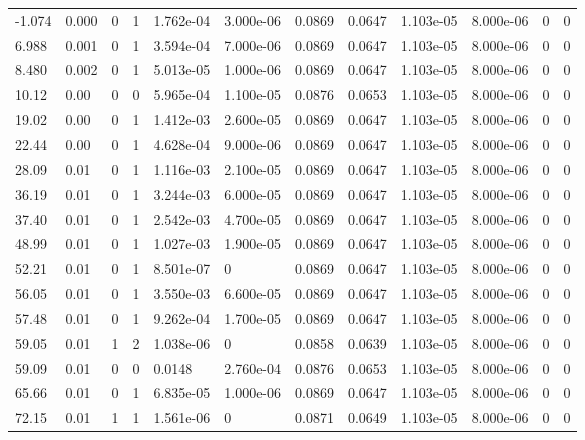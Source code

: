 \documentclass[preview]{standalone}
\begin{document}
{{\begin{tabular}{L{1.2cm}C{1.2cm} C{0.3cm}C{0.5cm} C{1.4cm}C{1.4cm} C{1.4cm}C{1.4cm} C{1.6cm}C{1.6cm} C{1.6cm}C{1.6cm}}
  -1.074  &  0.000  & 0     &  1 &  1.762e-04  & 3.000e-06  &  0.0869&   0.0647& 1.103e-05 & 8.000e-06   &  0 & 0  \\ 
  6.988  &  0.001  & 0     &  1 &  3.594e-04  & 7.000e-06  &  0.0869&   0.0647& 1.103e-05 & 8.000e-06   &  0 & 0  \\ 
  8.480  &  0.002  & 0     &  1 &  5.013e-05  & 1.000e-06  &  0.0869&   0.0647& 1.103e-05 & 8.000e-06   &  0 & 0  \\ 
  10.12  &  0.00  & 0     &  0 &  5.965e-04  & 1.100e-05  &  0.0876&   0.0653& 1.103e-05 & 8.000e-06   &  0 & 0  \\ 
  19.02  &  0.00  & 0     &  1 &  1.412e-03  & 2.600e-05  &  0.0869&   0.0647& 1.103e-05 & 8.000e-06   &  0 & 0  \\ 
  22.44  &  0.00  & 0     &  1 &  4.628e-04  & 9.000e-06  &  0.0869&   0.0647& 1.103e-05 & 8.000e-06   &  0 & 0  \\ 
  28.09  &  0.01  & 0     &  1 &  1.116e-03  & 2.100e-05  &  0.0869&   0.0647& 1.103e-05 & 8.000e-06   &  0 & 0  \\ 
  36.19  &  0.01  & 0     &  1 &  3.244e-03  & 6.000e-05  &  0.0869&   0.0647& 1.103e-05 & 8.000e-06   &  0 & 0  \\ 
  37.40  &  0.01  & 0     &  1 &  2.542e-03  & 4.700e-05  &  0.0869&   0.0647& 1.103e-05 & 8.000e-06   &  0 & 0  \\ 
  48.99  &  0.01  & 0     &  1 &  1.027e-03  & 1.900e-05  &  0.0869&   0.0647& 1.103e-05 & 8.000e-06   &  0 & 0  \\ 
  52.21  &  0.01  & 0     &  1 &  8.501e-07  & 0  &  0.0869&   0.0647& 1.103e-05 & 8.000e-06   &  0 & 0  \\ 
  56.05  &  0.01  & 0     &  1 &  3.550e-03  & 6.600e-05  &  0.0869&   0.0647& 1.103e-05 & 8.000e-06   &  0 & 0  \\ 
  57.48  &  0.01  & 0     &  1 &  9.262e-04  & 1.700e-05  &  0.0869&   0.0647& 1.103e-05 & 8.000e-06   &  0 & 0  \\ 
  59.05  &  0.01  & 1     &  2 &  1.038e-06  & 0  &  0.0858&   0.0639& 1.103e-05 & 8.000e-06   &  0 & 0  \\ 
  59.09  &  0.01  & 0     &  0 &  0.0148  & 2.760e-04  &  0.0876&   0.0653& 1.103e-05 & 8.000e-06   &  0 & 0  \\ 
  65.66  &  0.01  & 0     &  1 &  6.835e-05  & 1.000e-06  &  0.0869&   0.0647& 1.103e-05 & 8.000e-06   &  0 & 0  \\ 
  72.15  &  0.01  & 1     &  1 &  1.561e-06  & 0  &  0.0871&   0.0649& 1.103e-05 & 8.000e-06   &  0 & 0  \\ 

\end{tabular}}}
\end{document}
